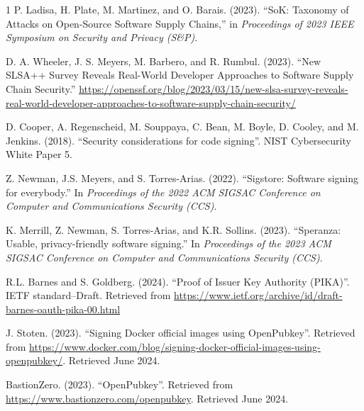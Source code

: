 \documentclass{IEEEcsmagTechrxiv}
\begin{document}
\begin{thebibliography}{1}
    P. Ladisa, H. Plate, M. Martinez, and O. Barais. (2023).
    ``SoK: Taxonomy of Attacks on Open-Source Software Supply Chains,'' in
	{\it Proceedings of 2023 IEEE Symposium on Security and Privacy (S\&P)}.

     D. A. Wheeler, J. S. Meyers, M. Barbero, and R. Rumbul. (2023).
     ``New SLSA++ Survey Reveals Real-World Developer Approaches to Software Supply Chain Security.''
     \url{https://openssf.org/blog/2023/03/15/new-slsa-survey-reveals-real-world-developer-approaches-to-software-supply-chain-security/}

     D. Cooper, A. Regenscheid, M. Souppaya, C. Bean, M. Boyle, D. Cooley, and M. Jenkins. (2018).
     ``Security considerations for code signing''.
     NIST Cybersecurity White Paper 5.

     Z. Newman, J.S. Meyers, and S. Torres-Arias.
     (2022).
     ``Sigstore: Software signing for everybody.''
     In
     \textit{Proceedings of the 2022 ACM SIGSAC Conference on Computer and Communications Security (CCS)}.
     
     K. Merrill, Z. Newman, S. Torres-Arias, and K.R. Sollins.
     (2023).
     ``Speranza: Usable, privacy-friendly software signing.''
     In
     \textit{Proceedings of the 2023 ACM SIGSAC Conference on Computer and Communications Security (CCS)}.

     R.L. Barnes and S. Goldberg.
     (2024).
     ``Proof of Issuer Key Authority (PIKA)''.
     IETF standard--Draft.
     Retrieved from \url{https://www.ietf.org/archive/id/draft-barnes-oauth-pika-00.html}

     J. Stoten.
     (2023).
     ``Signing Docker official images using OpenPubkey''.
     Retrieved from \url{https://www.docker.com/blog/signing-docker-official-images-using-openpubkey/}. Retrieved June 2024. 

    BastionZero.
    (2023).
    ``OpenPubkey''.
    Retrieved from \url{https://www.bastionzero.com/openpubkey}. Retrieved June 2024.

     

 
\end{thebibliography}\vspace*{-8pt}
\end{document}
